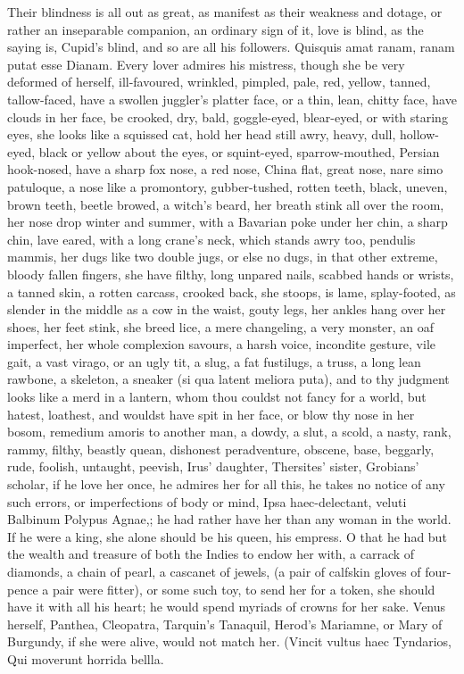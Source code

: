 {Their blindness is all out as great, as manifest as their weakness and
dotage, or rather an inseparable companion, an ordinary sign of it,
 love is blind, as the saying is, Cupid's blind, and so are all
his followers. Quisquis amat ranam, ranam putat esse Dianam. Every
lover admires his mistress, though she be very deformed of herself,
ill-favoured, wrinkled, pimpled, pale, red, yellow, tanned,
tallow-faced, have a swollen juggler's platter face, or a thin, lean,
chitty face, have clouds in her face, be crooked, dry, bald,
goggle-eyed, blear-eyed, or with staring eyes, she looks like a
squissed cat, hold her head still awry, heavy, dull, hollow-eyed, black
or yellow about the eyes, or squint-eyed, sparrow-mouthed, Persian
hook-nosed, have a sharp fox nose, a red nose, China flat, great nose,
nare simo patuloque, a nose like a promontory, gubber-tushed, rotten
teeth, black, uneven, brown teeth, beetle browed, a witch's beard, her
breath stink all over the room, her nose drop winter and summer, with a
Bavarian poke under her chin, a sharp chin, lave eared, with a long
crane's neck, which stands awry too, pendulis mammis, her dugs like two
double jugs, or else no dugs, in that other extreme, bloody fallen
fingers, she have filthy, long unpared nails, scabbed hands or wrists,
a tanned skin, a rotten carcass, crooked back, she stoops, is lame,
splay-footed, as slender in the middle as a cow in the waist, gouty
legs, her ankles hang over her shoes, her feet stink, she breed lice, a
mere changeling, a very monster, an oaf imperfect, her whole complexion
savours, a harsh voice, incondite gesture, vile gait, a vast virago, or
an ugly tit, a slug, a fat fustilugs, a truss, a long lean rawbone, a
skeleton, a sneaker (si qua latent meliora puta), and to thy judgment
looks like a merd in a lantern, whom thou couldst not fancy for a
world, but hatest, loathest, and wouldst have spit in her face, or blow
thy nose in her bosom, remedium amoris to another man, a dowdy, a slut,
a scold, a nasty, rank, rammy, filthy, beastly quean, dishonest
peradventure, obscene, base, beggarly, rude, foolish, untaught,
peevish, Irus' daughter, Thersites' sister, Grobians' scholar, if he
love her once, he admires her for all this, he takes no notice of any
such errors, or imperfections of body or mind, Ipsa
haec-delectant, veluti Balbinum Polypus Agnae,; he had rather have her
than any woman in the world. If he were a king, she alone should be his
queen, his empress. O that he had but the wealth and treasure of both
the Indies to endow her with, a carrack of diamonds, a chain of pearl,
a cascanet of jewels, (a pair of calfskin gloves of four-pence a pair
were fitter), or some such toy, to send her for a token, she should
have it with all his heart; he would spend myriads of crowns for her
sake. Venus herself, Panthea, Cleopatra, Tarquin's Tanaquil, Herod's
Mariamne, or Mary of Burgundy, if she were alive, would not match
her.
(Vincit vultus haec Tyndarios,
Qui moverunt horrida bellla.

}
